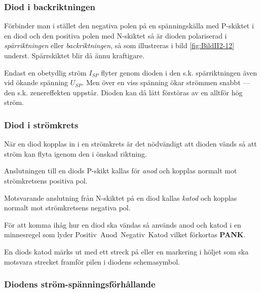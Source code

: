 \subsubsection{Diod i backriktningen}


Förbinder man i stället den negativa polen på en spänningskälla med P-skiktet i
en diod och den positiva polen med N-skiktet så är dioden polariserad i
\emph{spärriktningen} eller \emph{backriktningen}, så som illustreras i bild
\ref{fig:BildII2-12} underst.  Spärrskiktet blir då ännu kraftigare.

Endast en obetydlig ström \(I_{SP}\) flyter genom dioden i den s.k.
spärriktningen även vid ökande spänning \(U_{SP}\).
Men över en viss spänning ökar strömmen snabbt --- den s.k. zenereffekten
uppstår.
Dioden kan då lätt förstöras av en alltför hög ström.

\subsubsection{Diod i strömkrets}

När en diod kopplas in i en strömkrets är det nödvändigt att dioden vänds så att
ström kan flyta igenom den i önskad riktning.

Anslutningen till en diods P-skikt kallas för \emph{anod} och kopplas normalt
mot strömkretsens positiva pol.

Motsvarande anslutning från N-skiktet på en diod kallas \emph{katod} och kopplas
normalt mot strömkretsens negativa pol.

För att komma ihåg hur en diod ska vändas så används anod och katod i en
minnesregel som lyder Positiv~Anod~Negativ~Katod vilket förkortas \textbf{PANK}.

En diods katod märks ut med ett streck på eller en markering i höljet som ska
motsvara strecket framför pilen i diodens schemasymbol.

\subsubsection{Diodens ström-spänningsförhållande}


